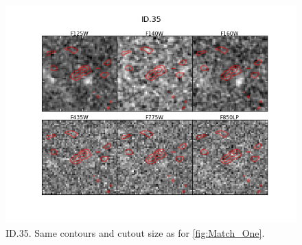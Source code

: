 \begin{figure}[tbp]
\centering \includegraphics[width=160mm]{Matched/ASPECS_Cutout_34.png}
\caption{ID.35. Same contours and cutout size as for \ref{fig:Match_One}.}
\label{fig:Match_Three}
\end{figure}
